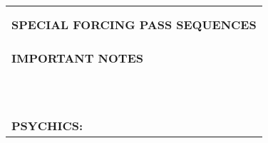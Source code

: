 \documentclass{article}
\begin{document}
\begin{minipage}{90mm}
\begin{tabular}{| p{88mm} |}
		\\ \hline
		\\ \hline
		\\ \hline
		\\ \hline
		\textbf{SPECIAL FORCING PASS SEQUENCES} \\ \hline
		\\ \hline
		\\ \hline
		\\ \hline
		\textbf{IMPORTANT NOTES} \\ \hline
		\\ \hline
		\\ \hline
		\\ \hline
		\\ \hline
		\\ \hline
		\\ \hline
		\\ \hline
		\\ \hline
		\\ \hline
		\\ \hline
		\\ \hline
		\textbf{PSYCHICS:} \\ \hline
	\end{tabular}
\end{minipage}
\end{document}
